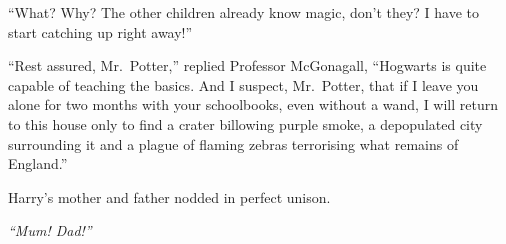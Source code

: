 ``What? Why? The other children already know magic, don't they? I have
to start catching up right away!''

``Rest assured, Mr.~Potter,'' replied Professor McGonagall, ``Hogwarts
is quite capable of teaching the basics. And I suspect, Mr.~Potter, that
if I leave you alone for two months with your schoolbooks, even without
a wand, I will return to this house only to find a crater billowing
purple smoke, a depopulated city surrounding it and a plague of flaming
zebras terrorising what remains of England.''

Harry's mother and father nodded in perfect unison.

\emph{``Mum! Dad!''}

